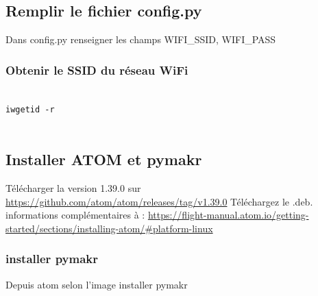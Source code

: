 \documentclass{article}
\begin{document}
\subsection{Remplir le fichier config.py}

Dans config.py renseigner les champs WIFI\_SSID, WIFI\_PASS

\subsubsection{Obtenir le SSID du réseau WiFi}
\begin{verbatim}

iwgetid -r


\end{verbatim}

\subsection{Installer ATOM et pymakr}

Télécharger la version 1.39.0 sur \url{https://github.com/atom/atom/releases/tag/v1.39.0}
Téléchargez le .deb. \\


informations complémentaires à : \url{https://flight-manual.atom.io/getting-started/sections/installing-atom/#platform-linux}

\subsubsection{installer pymakr}


Depuis atom selon l'image installer pymakr
\end{document}
